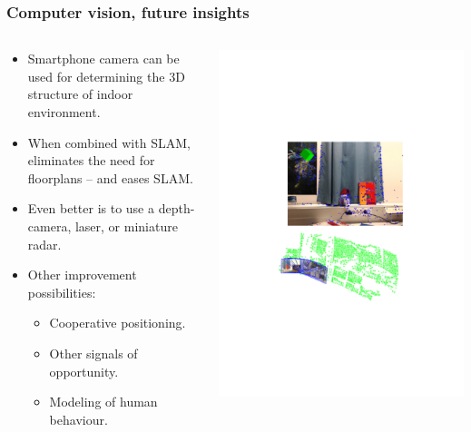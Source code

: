 \documentclass[xcolor=svgnames,english,handout]{beamer}
\begin{document}
\begin{frame}
  \frametitle{Computer vision, future insights}

  \begin{columns}
  \begin{column}{0.51\textwidth}
  \begin{itemize}[<+->]
  \item \alert{Smartphone camera} can be used for determining the \alert{3D structure of indoor environment}.
  \item When \alert{combined with SLAM}, eliminates the need for floorplans -- and eases SLAM.
  \item Even better is to use a \alert{depth-camera, laser, or miniature radar}.
  \item Other \alert{improvement possibilities}:
  \begin{itemize}[<+->]
  \item Cooperative positioning.
  \item Other signals of opportunity.
  \item Modeling of human behaviour.
  \end{itemize}
  \end{itemize}
  \end{column}
  \begin{column}{0.49\textwidth}
  \includegraphics[width=\columnwidth]{pointcloud} \\
  \end{column}
  \end{columns}
\end{frame}
\end{document}
